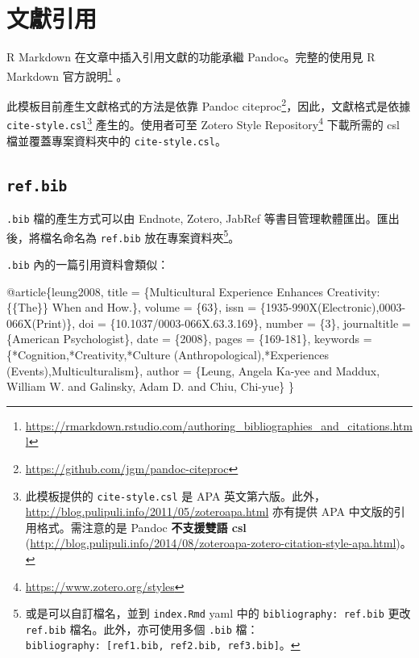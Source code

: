 \documentclass[oneside]{book}
\newenvironment{Shaded}{\begin{snugshade}}{\end{snugshade}}
\newcommand{\DataTypeTok}[1]{\textcolor[rgb]{0.13,0.29,0.53}{#1}}
\newcommand{\NormalTok}[1]{#1}
\newcommand{\OtherTok}[1]{\textcolor[rgb]{0.56,0.35,0.01}{#1}}
\newcommand{\VariableTok}[1]{\textcolor[rgb]{0.00,0.00,0.00}{#1}}
\renewcommand{\href}[2]{#2\footnote{\url{#1}}}
\begin{document}
\hypertarget{bib-cite}{%
\section{文獻引用}\label{bib-cite}}

R Markdown 在文章中插入引用文獻的功能承繼 Pandoc。完整的使用見 \href{https://rmarkdown.rstudio.com/authoring_bibliographies_and_citations.html}{R Markdown 官方說明} 。

此模板目前產生文獻格式的方法是依靠 \href{https://github.com/jgm/pandoc-citeproc}{Pandoc citeproc}，因此，文獻格式是依據 \texttt{cite-style.csl}\footnote{此模板提供的 \texttt{cite-style.csl} 是 APA 英文第六版。此外，\url{http://blog.pulipuli.info/2011/05/zoteroapa.html} 亦有提供 APA 中文版的引用格式。需注意的是 Pandoc \textbf{不支援雙語 csl} (\url{http://blog.pulipuli.info/2014/08/zoteroapa-zotero-citation-style-apa.html})。} 產生的。使用者可至 \href{https://www.zotero.org/styles}{Zotero Style Repository} 下載所需的 csl 檔並覆蓋專案資料夾中的 \texttt{cite-style.csl}。

\hypertarget{ref-bib}{%
\subsection{\texorpdfstring{\texttt{ref.bib}}{ref.bib}}\label{ref-bib}}

\texttt{.bib} 檔的產生方式可以由 Endnote, Zotero, JabRef 等書目管理軟體匯出。匯出後，將檔名命名為 \texttt{ref.bib} 放在專案資料夾\footnote{或是可以自訂檔名，並到 \texttt{index.Rmd} yaml 中的 \texttt{bibliography:\ ref.bib} 更改 \texttt{ref.bib} 檔名。此外，亦可使用多個 \texttt{.bib} 檔：\texttt{bibliography:\ {[}ref1.bib,\ ref2.bib,\ ref3.bib{]}}。}。

\texttt{.bib} 內的一篇引用資料會類似：

\begin{Shaded}
\begin{Highlighting}[]
\VariableTok{@article}\NormalTok{\{}\OtherTok{leung2008}\NormalTok{,}
  \DataTypeTok{title}\NormalTok{ = \{Multicultural Experience Enhances Creativity: \{\{The\}\} When and How.\},}
  \DataTypeTok{volume}\NormalTok{ = \{63\},}
  \DataTypeTok{issn}\NormalTok{ = \{1935-990X(Electronic),0003-066X(Print)\},}
  \DataTypeTok{doi}\NormalTok{ = \{10.1037/0003-066X.63.3.169\},}
  \DataTypeTok{number}\NormalTok{ = \{3\},}
  \DataTypeTok{journaltitle}\NormalTok{ = \{American Psychologist\},}
  \DataTypeTok{date}\NormalTok{ = \{2008\},}
  \DataTypeTok{pages}\NormalTok{ = \{169-181\},}
  \DataTypeTok{keywords}\NormalTok{ = \{*Cognition,*Creativity,*Culture (Anthropological),*Experiences (Events),Multiculturalism\},}
  \DataTypeTok{author}\NormalTok{ = \{Leung, Angela Ka-yee and Maddux, William W. and Galinsky, Adam D. and Chiu, Chi-yue\}}
\NormalTok{\}}
\end{Highlighting}
\end{Shaded}
\end{document}
